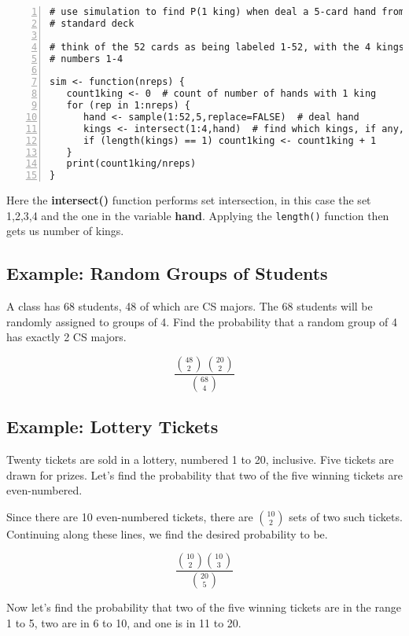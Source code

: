 \begin{Verbatim}[fontsize=\relsize{-2},numbers=left]
# use simulation to find P(1 king) when deal a 5-card hand from a
# standard deck

# think of the 52 cards as being labeled 1-52, with the 4 kings having
# numbers 1-4

sim <- function(nreps) {
   count1king <- 0  # count of number of hands with 1 king
   for (rep in 1:nreps) {
      hand <- sample(1:52,5,replace=FALSE)  # deal hand
      kings <- intersect(1:4,hand)  # find which kings, if any, are in hand
      if (length(kings) == 1) count1king <- count1king + 1
   }
   print(count1king/nreps)
}
\end{Verbatim}

Here the {\bf intersect()} function performs set intersection, in this
case the set {1,2,3,4} and the one in the variable {\bf hand}.  Applying
the {\tt length()} function then gets us number of kings.

\subsection{Example:  Random Groups of Students}

A class has 68 students, 48 of which are CS majors.  The
68 students will be randomly assigned to groups of 4.  Find the
probability that a random group of 4 has exactly 2 CS majors.

$$
\frac
{\binom{48}{2} ~ \binom{20}{2}}
{\binom{68}{4}}
$$


\subsection{Example:  Lottery Tickets}
\label{lottery}

Twenty tickets are sold in a lottery, numbered 1 to 20,
inclusive.  Five tickets are drawn for prizes.  Let's find the
probability that two of the five winning tickets are
even-numbered.

Since there are 10 even-numbered tickets, there are $\binom{10}{2}$ sets
of two such tickets.  Continuing along these lines, we find the desired
probability to be.

\begin{equation}
\frac
{\binom{10}{2} \binom{10}{3}}
{\binom{20}{5}}
\end{equation}

Now let's find the probability that two of the five winning tickets are
in the range 1 to 5, two are in 6 to 10, and one is in 11 to 20.  


